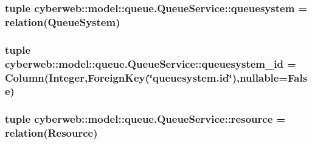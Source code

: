 \hypertarget{classcyberweb_1_1model_1_1queue_1_1_queue_service_a2ee4db39e5affad045e94d9c16cecf6e}{
\subsubsection[{queuesystem}]{\setlength{\rightskip}{0pt plus 5cm}tuple {\bf cyberweb\-::model\-::queue.\-Queue\-Service\-::queuesystem} = relation({\bf \-Queue\-System})}}\label{classcyberweb_1_1model_1_1queue_1_1_queue_service_a2ee4db39e5affad045e94d9c16cecf6e}
\hypertarget{classcyberweb_1_1model_1_1queue_1_1_queue_service_a9704424ca9cebb23aa848a46e2a8a9a8}{
\subsubsection[{queuesystem\-\_\-id}]{\setlength{\rightskip}{0pt plus 5cm}tuple {\bf cyberweb\-::model\-::queue.\-Queue\-Service\-::queuesystem\-\_\-id} = \-Column(\-Integer,\-Foreign\-Key(\char`\"{}queuesystem.\-id\char`\"{}),nullable=\-False)}}\label{classcyberweb_1_1model_1_1queue_1_1_queue_service_a9704424ca9cebb23aa848a46e2a8a9a8}
\hypertarget{classcyberweb_1_1model_1_1queue_1_1_queue_service_afe3030bebd4b7fe17eb1abf6391fd6d0}{
\subsubsection[{resource}]{\setlength{\rightskip}{0pt plus 5cm}tuple {\bf cyberweb\-::model\-::queue.\-Queue\-Service\-::resource} = relation({\bf \-Resource})}}\label{classcyberweb_1_1model_1_1queue_1_1_queue_service_afe3030bebd4b7fe17eb1abf6391fd6d0}
